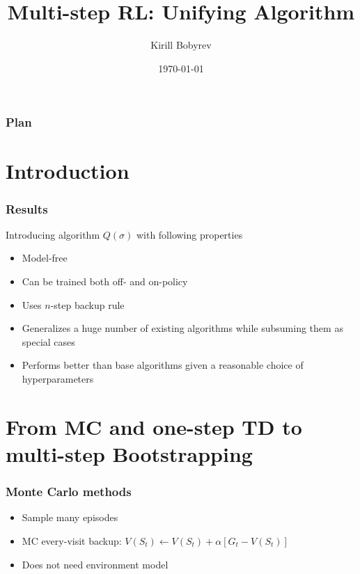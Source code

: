 \documentclass{beamer}
\title{Multi-step RL: Unifying Algorithm}
\author{Kirill Bobyrev}
\date{\today}
\begin{document}
\begin{frame}
  \titlepage
\end{frame}

\begin{frame}
  \frametitle{Plan}
  \tableofcontents
\end{frame}


\section{Introduction}

\begin{frame}
  \frametitle{Results}
  Introducing algorithm $Q(\sigma)$ with following properties
  \begin{itemize}
    \item Model-free
    \item Can be trained both off- and on-policy
    \item Uses $n$-step backup rule
    \item Generalizes a huge number of existing algorithms while subsuming them
      as special cases
    \item Performs better than base algorithms given a reasonable choice of
      hyperparameters
  \end{itemize}
\end{frame}

\section{From MC and one-step TD to multi-step Bootstrapping}

\begin{frame}
  \frametitle{Monte Carlo methods}
  \begin{itemize}
    \item Sample many episodes
    \item MC every-visit backup: $V(S_t) \leftarrow V(S_t) +
      \alpha[G_t - V(S_t)]$
    \item Does not need environment model
  \end{itemize}
\end{frame}
\end{document}
